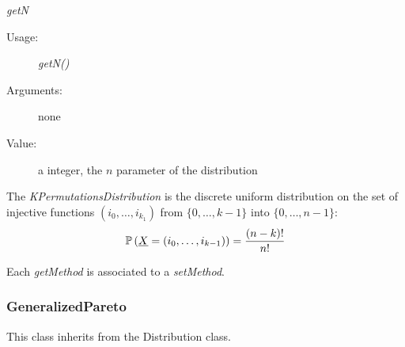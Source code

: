 \begin{description}
\begin{description}
\item \textit{getN}
\begin{description}
\item[Usage:] \textit{getN()}
\item[Arguments:] none
\item[Value:]  a integer, the $n$ parameter of the  distribution
\end{description}

\end{description}

\item[Details:]  \rule{0pt}{1em}
\begin{description}
\item The
\textit{KPermutationsDistribution} is the discrete uniform distribution
on the set of injective functions $(i_0, \hdots, i_{k_1})$ from $\{0, \hdots, k-1\}$ into
$\{0, \hdots, n-1\}$:
\begin{equation}
\displaystyle {\mathbb P}\left( {\underline{X}} = (i_0, \hdots, i_{k-1}) \right) = \frac{(n-k)!}{n!}
\end{equation}
\end{description}

\item[Links:]  \rule{0pt}{1em}
\end{description}

Each  \textit{getMethod}  is associated to a \textit{setMethod}.


\newpage
\subsubsection{GeneralizedPareto}

This class inherits from the Distribution class.

